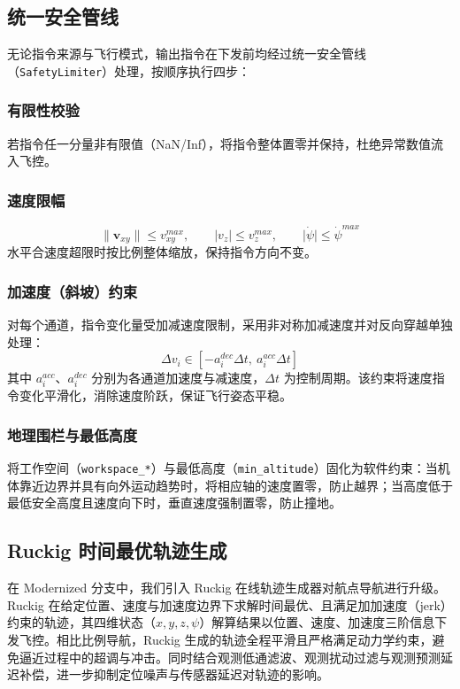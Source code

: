 \subsection{统一安全管线}
无论指令来源与飞行模式，输出指令在下发前均经过统一安全管线（\lstinline{SafetyLimiter}）处理，按顺序执行四步：
\subsubsection{有限性校验}
若指令任一分量非有限值（NaN/Inf），将指令整体置零并保持，杜绝异常数值流入飞控。
\subsubsection{速度限幅}
\begin{equation}
    \lVert \boldsymbol{v}_{xy}\rVert \le v_{xy}^{max},\qquad
    \lvert v_z \rvert \le v_z^{max},\qquad
    \lvert \dot\psi \rvert \le \dot\psi^{max}
\end{equation}
水平合速度超限时按比例整体缩放，保持指令方向不变。
\subsubsection{加速度（斜坡）约束}
对每个通道，指令变化量受加减速度限制，采用非对称加减速度并对反向穿越单独处理：
\begin{equation}
    \Delta v_i \in \left[ -a_i^{dec}\Delta t,\ a_i^{acc}\Delta t \right]
\end{equation}
其中 $a_i^{acc}$、$a_i^{dec}$ 分别为各通道加速度与减速度，$\Delta t$ 为控制周期。该约束将速度指令变化平滑化，消除速度阶跃，保证飞行姿态平稳。
\subsubsection{地理围栏与最低高度}
将工作空间（\lstinline{workspace_*}）与最低高度（\lstinline{min_altitude}）固化为软件约束：当机体靠近边界并具有向外运动趋势时，将相应轴的速度置零，防止越界；当高度低于最低安全高度且速度向下时，垂直速度强制置零，防止撞地。

\subsection{Ruckig 时间最优轨迹生成}
在 Modernized 分支中，我们引入 Ruckig 在线轨迹生成器对航点导航进行升级。Ruckig 在给定位置、速度与加速度边界下求解时间最优、且满足加加速度（jerk）约束的轨迹，其四维状态（$x,y,z,\psi$）解算结果以位置、速度、加速度三阶信息下发飞控。相比比例导航，Ruckig 生成的轨迹全程平滑且严格满足动力学约束，避免逼近过程中的超调与冲击。同时结合观测低通滤波、观测扰动过滤与观测预测延迟补偿，进一步抑制定位噪声与传感器延迟对轨迹的影响。

